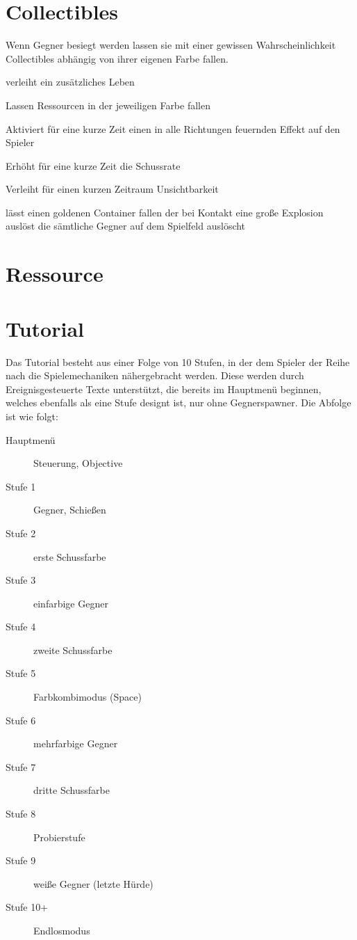 \documentclass[a4paper,10pt,ngerman,fontsize=12pt]{scrreprt}
\begin{document}
\section{Collectibles}

Wenn Gegner besiegt werden lassen sie mit einer gewissen Wahrscheinlichkeit Collectibles abhängig von ihrer eigenen Farbe fallen.

\renewcommand{\itmspace}{5.5em}
{verleiht ein zusätzliches Leben}

{Lassen Ressourcen in der jeweiligen Farbe fallen}

{Aktiviert für eine kurze Zeit einen in alle Richtungen feuernden Effekt auf den Spieler}

{Erhöht für eine kurze Zeit die Schussrate}

{Verleiht für einen kurzen Zeitraum Unsichtbarkeit}

{lässt einen goldenen Container fallen der bei Kontakt eine gro{\ss}e Explosion auslöst die sämtliche Gegner auf dem Spielfeld auslöscht}




\section{Ressource}




\section{Tutorial}

Das Tutorial besteht aus einer Folge von 10 Stufen, in der dem Spieler der Reihe nach die Spielemechaniken nähergebracht werden. Diese werden durch Ereignisgesteuerte Texte unterstützt, die bereits im Hauptmenü beginnen, welches ebenfalls als eine Stufe designt ist, nur ohne Gegnerspawner. Die Abfolge ist wie folgt:

\begin{description}
\item[Hauptmenü] Steuerung, Objective
\item[Stufe 1] Gegner, Schie{\ss}en
\item[Stufe 2] erste Schussfarbe
\item[Stufe 3] einfarbige Gegner
\item[Stufe 4] zweite Schussfarbe
\item[Stufe 5] Farbkombimodus (Space)
\item[Stufe 6] mehrfarbige Gegner
\item[Stufe 7] dritte Schussfarbe
\item[Stufe 8] Probierstufe
\item[Stufe 9] wei{\ss}e Gegner (letzte Hürde)
\item[Stufe 10+] Endlosmodus
\end{description}
\end{document}
